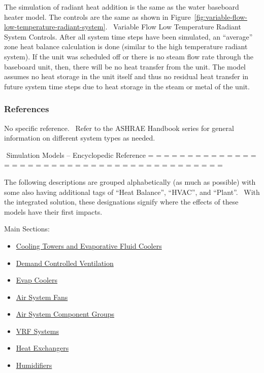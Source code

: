 The simulation of radiant heat addition is the same as the water baseboard heater model. The controls are the same as shown in Figure~\ref{fig:variable-flow-low-temperature-radiant-system}.~ Variable Flow Low Temperature Radiant System Controls. After all system time steps have been simulated, an ``average'' zone heat balance calculation is done (similar to the high temperature radiant system). If the unit was scheduled off or there is no steam flow rate through the baseboard unit, then, there will be no heat transfer from the unit. The model assumes no heat storage in the unit itself and thus no residual heat transfer in future system time steps due to heat storage in the steam or metal of the unit.

\subsubsection{References}\label{references-1-007}

No specific reference.~ Refer to the ASHRAE Handbook series for general information on different system types as needed.

﻿ Simulation Models -- Encyclopedic Reference = = = = = = = = = = = = = = = = = = = = = = = = = = = = = = = = = = = = = = = = = =

The following descriptions are grouped alphabetically (as much as possible) with some also having additional tags of ``Heat Balance'', ``HVAC'', and ``Plant''.~ With the integrated solution, these designations signify where the effects of these models have their first impacts.

Main Sections:

\begin{itemize}
\tightlist
\item
  \protect\hyperlink{TowersAndCoolers}{Cooling Towers and Evaporative Fluid Coolers}
\item
  \protect\hyperlink{DCV}{Demand Controlled Ventilation}
\item
  \protect\hyperlink{EvapCoolers}{Evap Coolers}
\item
  \protect\hyperlink{Fans}{Air System Fans}
\item
  \protect\hyperlink{AirComponentGroups}{Air System Component Groups}
\item
  \protect\hyperlink{VRF}{VRF Systems}
\item
  \protect\hyperlink{HX}{Heat Exchangers}
\item
  \protect\hyperlink{Humidifiers}{Humidifiers} 
\end{itemize}
